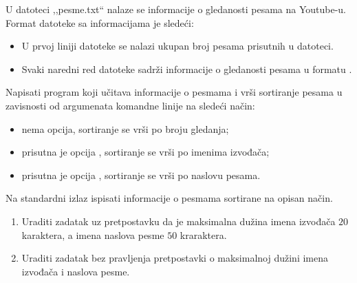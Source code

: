 \begin{Exercise}[label=513]
U datoteci ,,pesme.txt`` nalaze se informacije o gledanosti pesama na
Youtube-u. Format datoteke sa informacijama je sledeći:
\begin{itemize}
\item U prvoj liniji datoteke se nalazi ukupan broj pesama prisutnih u
  datoteci.
\item Svaki naredni red datoteke sadrži informacije o gledanosti
  pesama u formatu .
\end{itemize}
Napisati program koji učitava informacije o pesmama i vrši sortiranje
pesama u zavisnosti od argumenata komandne linije na sledeći način:
\begin{itemize}
\item nema opcija, sortiranje se vrši po broju gledanja;
\item prisutna je opcija , sortiranje se vrši po imenima
  izvođača;
\item prisutna je opcija , sortiranje se vrši po naslovu
  pesama.
\end{itemize}
Na standardni izlaz ispisati informacije o pesmama sortirane na opisan
način.
\begin{enumerate}
\item Uraditi zadatak uz pretpostavku da je maksimalna dužina imena
  izvođača $20$ karaktera, a imena naslova pesme $50$ kraraktera.
\item Uraditi zadatak bez pravljenja pretpostavki o maksimalnoj dužini
  imena izvođača i naslova pesme.
\end{enumerate}


\end{Exercise}

